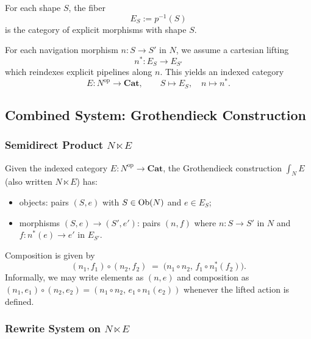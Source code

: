 \begin{definition}[Fibers]
For each shape \(S\), the fiber
\[
E_S := p^{-1}(S)
\]
is the category of explicit morphisms with shape \(S\).
\end{definition}

\begin{definition}
For each navigation morphism \(n : S \to S'\) in \(N\), we assume a
cartesian lifting
\[
n^\ast : E_S \to E_{S'}
\]
which reindexes explicit pipelines along \(n\). This yields an indexed
category
\[
E : N^{\mathrm{op}} \to \mathbf{Cat},
\qquad
S \mapsto E_S,\quad
n \mapsto n^\ast.
\]
\end{definition}

\subsection{Combined System: Grothendieck Construction}

\subsubsection{Semidirect Product \texorpdfstring{\(N \ltimes E\)}{N ⋉ E}}

\begin{definition}
Given the indexed category
\(E : N^{\mathrm{op}} \to \mathbf{Cat}\), the Grothendieck
construction \(\int_N E\) (also written \(N \ltimes E\)) has:
\begin{itemize}
  \item objects: pairs \((S, e)\) with \(S \in \mathrm{Ob}(N)\) and \(e \in E_S\);
  \item morphisms \((S, e) \to (S', e')\): pairs \((n, f)\) where
        \(n : S \to S'\) in \(N\) and
        \(f : n^\ast(e) \to e'\) in \(E_{S'}\).
\end{itemize}
Composition is given by
\[
(n_1, f_1) \circ (n_2, f_2)
\;=\;
\bigl(
  n_1 \circ n_2,\,
  f_1 \circ n_1^\ast(f_2)
\bigr).
\]
Informally, we may write elements as \((n, e)\) and composition as
\((n_1, e_1) \circ (n_2, e_2) =
 (n_1 \circ n_2,\, e_1 \circ n_1(e_2))\) whenever the lifted action is defined.
\end{definition}

\subsubsection{Rewrite System on \texorpdfstring{\(N \ltimes E\)}{N ⋉ E}}

